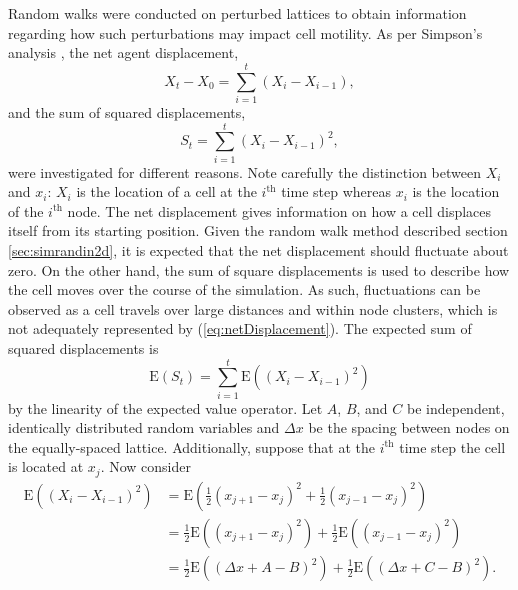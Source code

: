 \documentclass[11pt,titlepage,a4paper]{article}
\begin{document}
			Random walks were conducted on perturbed lattices to obtain information regarding how such perturbations may impact cell motility. As per Simpson's analysis \cite{simpson2009diffusing}, the net agent displacement,
			\begin{equation}
				\label{eq:netDisplacement}
				X_t - X_0 = \sum_{i = 1}^{t} \left (X_i - X_{i-1} \right),
			\end{equation}
			and the sum of squared displacements,
			\begin{equation}
				\label{eq:sumSquaredDisplacement}
				S_t = \sum_{i = 1}^{t} \left (X_i - X_{i-1} \right)^2,
			\end{equation}
			were investigated for different reasons. Note carefully the distinction between $X_i$ and $x_i$: $X_i$ is the location of a cell at the $i^\text{th}$ time step whereas $x_i$ is the location of the $i^\text{th}$ node. The net displacement gives information on how a cell displaces itself from its starting position. Given the random walk method described section \ref{sec:simrandin2d}, it is expected that the net displacement should fluctuate about zero. On the other hand, the sum of square displacements is used to describe how the cell moves over the course of the simulation. As such, fluctuations can be observed as a cell travels over large distances and within node clusters, which is not adequately represented by (\ref{eq:netDisplacement}). The expected sum of squared displacements is
			\begin{equation}
				\label{eq:expectedSumSquaredDisp}
				\mathrm{E} \left(S_t \right) = \sum_{i = 1}^{t} \mathrm{E} \left( \left(X_i - X_{i-1} \right)^2 \right)
			\end{equation}
			by the linearity of the expected value operator. Let $A$, $B$, and $C$ be independent, identically distributed random variables and $\Delta x$ be the spacing between nodes on the equally-spaced lattice. Additionally, suppose that at the $i^\text{th}$ time step the cell is located at $x_j$. Now consider
			\begin{align*}
				\mathrm{E} \left( \left(X_i - X_{i-1} \right)^2 \right) &= \mathrm{E} \left( \frac{1}{2} \left(x_{j+1} - x_j \right)^2 + \frac{1}{2} \left(x_{j-1} - x_j \right)^2 \right) \\
				&= \frac{1}{2} \mathrm{E} \left(\left(x_{j+1} - x_j \right)^2 \right) + \frac{1}{2} \mathrm{E} \left(\left(x_{j-1} - x_j \right)^2 \right) \\
				&= \frac{1}{2} \mathrm{E} \left(\left(\Delta x + A - B \right)^2 \right) + \frac{1}{2} \mathrm{E} \left(\left(\Delta x + C - B \right)^2 \right).
			\end{align*}
\end{document}
